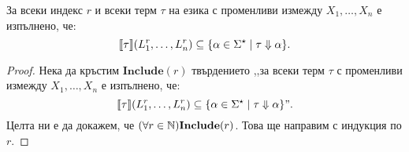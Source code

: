 
\begin{lemma}
  За всеки индекс $r$ и всеки терм $\tau$ на езика \REG с променливи измежду $X_1,\dots,X_n$ е изпълнено, че:
  \[\llbracket{\tau}\rrbracket(L^r_1,\dots,L^r_n) \subseteq \{\alpha \in \Sigma^\star \mid \tau \Downarrow \alpha\}.\]
\end{lemma}
\begin{proof}
  Нека да кръстим $\textbf{Include}(r)$ твърдението
  ,,за всеки терм $\tau$ с променливи измежду $X_1,\dots,X_n$ е изпълнено, че:
  \[\llbracket{\tau}\rrbracket(L^r_1,\dots,L^r_n) \subseteq \{\alpha \in \Sigma^\star \mid \tau \Downarrow \alpha\}".\]
  Целта ни е да докажем, че $(\forall r\in\mathbb{N})\textbf{Include}(r)$. Това ще направим с индукция по $r$.
  

\end{proof}
